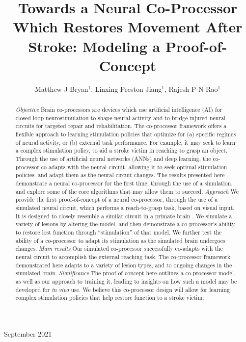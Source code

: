 \documentclass[12pt]{iopart}
\begin{document}
\title[Modeling a Neural Co-Processor]
{Towards a Neural Co-Processor Which Restores Movement After Stroke: Modeling a Proof-of-Concept}

\author{Matthew J Bryan$^{1}$, Linxing Preston Jiang$^{1}$, Rajesh P N Rao$^{1}$}

\address{$^{1}$ Neural Systems Laboratory, Department of Computer
Science and Engineering, University of Washington, Box 352350,
Seattle, WA 98105, USA}

\vspace{10pt}
\begin{indented}
\item[]September 2021
\end{indented}

\begin{abstract}
\textit{Objective} Brain co-processors\cite{rao.coproc} are devices which use artificial
intelligence (AI) for closed-loop neurostimulation to shape neural activity and to bridge
injured neural circuits for targeted repair and rehabilitation. The co-processor framework
offers a flexible approach to learning stimulation policies that optimize for
(a) specific regimes of neural activity, or (b) external task performance.
For example, it may seek to learn a complex stimulation policy, to aid a
stroke victim in reaching to grasp an object. Through the use of artificial neural
networks (ANNs) and deep learning, the co-processor co-adapts with the
neural circuit, allowing it to seek optimal stimulation policies, and adapt them
as the neural circuit changes. The results presented here demonstrate a
neural co-processor for the first time, through the use of a simulation, and
explore some of the core algorithms that may allow them to succeed.
\textit{Approach} We provide the first proof-of-concept of a neural co-processor,
through the use of a simulated neural circuit, which  performs a reach-to-grasp task,
based on visual input. It is designed to closely resemble a similar circuit in
a primate brain \cite{michaels.mrnn}. We simulate a variety of lesions by altering
the model, and then demonstrate a co-processor's ability to restore lost function
through ``stimulation'' of that model. We further test the ability of a co-processor to
adapt its stimulation as the simulated brain undergoes changes.
\textit{Main results} Our simulated co-processor successfully co-adapts with the neural
circuit to accomplish the external reaching task. The co-processor framework
demonstrated here adapts to a variety of lesion types, and to ongoing changes in the
simulated brain.
\textit{Significance} The proof-of-concept here outlines a co-processor model, as well
as our approach to training it, leading to insights on how such a model may be
developed for \textit{in vivo} use. We believe this co-processor design will allow for
learning complex stimulation policies that help restore function to a stroke victim.
\end{abstract}
\end{document}
